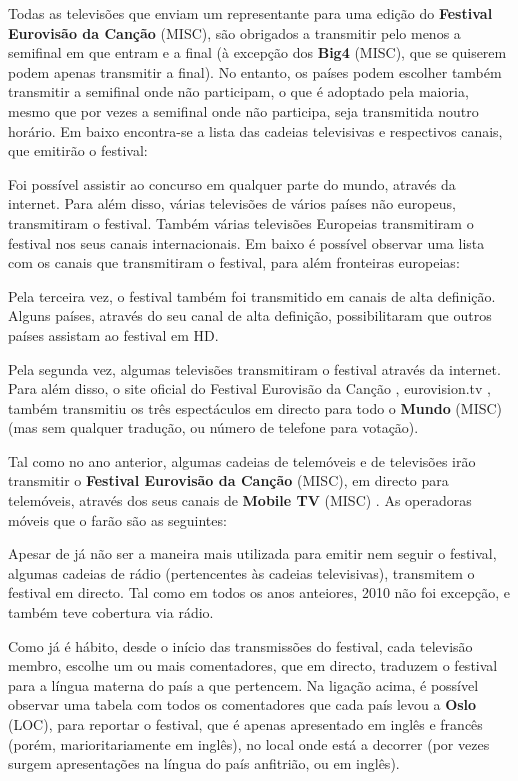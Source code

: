 \documentclass[12pt,a4paper]{article}
\begin{document}
Todas as televisões que enviam um representante para uma edição do \textbf{Festival Eurovisão da Canção} (MISC), são obrigados a transmitir pelo menos a semifinal em que entram e a final (à excepção dos \textbf{Big4} (MISC), que se quiserem podem apenas transmitir a final). No entanto, os países podem escolher também transmitir a semifinal onde não participam, o que é adoptado pela maioria, mesmo que por vezes a semifinal onde não participa, seja transmitida noutro horário. Em baixo encontra-se a lista das cadeias televisivas e respectivos canais, que emitirão o festival:

Foi possível assistir ao concurso em qualquer parte do mundo, através da internet. Para além disso, várias televisões de vários países não europeus, transmitiram o festival. Também várias televisões Europeias transmitiram o festival nos seus canais internacionais. Em baixo é possível observar uma lista com os canais que transmitiram o festival, para além fronteiras europeias:

Pela terceira vez, o festival também foi transmitido em canais de alta definição. Alguns países, através do seu canal de alta definição, possibilitaram que outros países assistam ao festival em HD.

Pela segunda vez, algumas televisões transmitiram o festival através da internet. Para além disso, o site oficial do Festival Eurovisão da Canção , eurovision.tv , também transmitiu os três espectáculos em directo para todo o \textbf{Mundo} (MISC) (mas sem qualquer tradução, ou número de telefone para votação).

Tal como no ano anterior, algumas cadeias de telemóveis e de televisões irão transmitir o \textbf{Festival Eurovisão da Canção} (MISC), em directo para telemóveis, através dos seus canais de \textbf{Mobile TV} (MISC) . As operadoras móveis que o farão são as seguintes:

Apesar de já não ser a maneira mais utilizada para emitir nem seguir o festival, algumas cadeias de rádio (pertencentes às cadeias televisivas), transmitem o festival em directo. Tal como em todos os anos anteiores, 2010 não foi excepção, e também teve cobertura via rádio.

Como já é hábito, desde o início das transmissões do festival, cada televisão membro, escolhe um ou mais comentadores, que em directo, traduzem o festival para a língua materna do país a que pertencem. Na ligação acima, é possível observar uma tabela com todos os comentadores que cada país levou a \textbf{Oslo} (LOC), para reportar o festival, que é apenas apresentado em inglês e francês (porém, marioritariamente em inglês), no local onde está a decorrer (por vezes surgem apresentações na língua do país anfitrião, ou em inglês).
\end{document}
